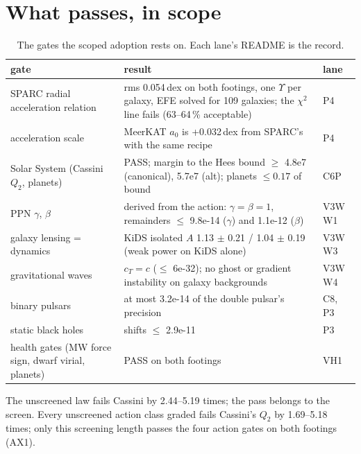 \documentclass[10pt]{article}
\begin{document}
\section{What passes, in scope}
\begin{table}[h]\centering\small
\caption{The gates the scoped adoption rests on. Each lane's README is the record.}\label{tab:pass}
\begin{tabular}{@{}p{3.6cm}p{8.6cm}l@{}}\toprule
gate & result & lane\\\midrule
SPARC radial acceleration relation & rms 0.054\,dex on both footings, one $\Upsilon$ per galaxy, EFE solved for 109 galaxies; the $\chi^2$ line fails (63--64\,\% acceptable) & P4\\
acceleration scale & MeerKAT $a_0$ is +0.032\,dex from SPARC's with the same recipe & P4\\
Solar System (Cassini $Q_2$, planets) & PASS; margin to the Hees bound $\ge$ 4.8e7 (canonical), 5.7e7 (alt); planets $\le0.17$ of bound & C6P\\
PPN $\gamma$, $\beta$ & derived from the action: $\gamma=\beta=1$, remainders $\le$ 9.8e-14 ($\gamma$) and 1.1e-12 ($\beta$) & V3W W1\\
galaxy lensing = dynamics & KiDS isolated $A$ 1.13 $\pm$ 0.21 / 1.04 $\pm$ 0.19 (weak power on KiDS alone) & V3W W3\\
gravitational waves & $c_T=c$ ($\le$ 6e-32); no ghost or gradient instability on galaxy backgrounds & V3W W4\\
binary pulsars & at most 3.2e-14 of the double pulsar's precision & C8, P3\\
static black holes & shifts $\le$ 2.9e-11 & P3\\
health gates (MW force sign, dwarf virial, planets) & PASS on both footings & VH1\\\bottomrule
\end{tabular}
\end{table}
The unscreened law fails Cassini by 2.44--5.19 times; the pass belongs to the screen. Every unscreened action class graded fails Cassini's $Q_2$ by 1.69--5.18 times; only this screening length passes the four action gates on both footings (AX1).
\end{document}
